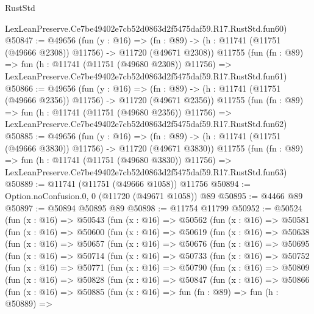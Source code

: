\begin{lexlean}{RustStd}
\begin{coremodule}
    LexLeanPreserve.Ce7be49402e7cb52d0863d2f5475daf59.R17.RustStd.fun60)
@50847 := @49656
    (fun (y : @16) =>
    (fn : @89) -> (h : @11741 (@11751 (@49666 @2308)) @11756) -> @11720 (@49671 @2308))
    @11755
    (fun (fn : @89) =>
    fun (h : @11741 (@11751 (@49680 @2308)) @11756) =>
    LexLeanPreserve.Ce7be49402e7cb52d0863d2f5475daf59.R17.RustStd.fun61)
@50866 := @49656
    (fun (y : @16) =>
    (fn : @89) -> (h : @11741 (@11751 (@49666 @2356)) @11756) -> @11720 (@49671 @2356))
    @11755
    (fun (fn : @89) =>
    fun (h : @11741 (@11751 (@49680 @2356)) @11756) =>
    LexLeanPreserve.Ce7be49402e7cb52d0863d2f5475daf59.R17.RustStd.fun62)
@50885 := @49656
    (fun (y : @16) =>
    (fn : @89) -> (h : @11741 (@11751 (@49666 @3830)) @11756) -> @11720 (@49671 @3830))
    @11755
    (fun (fn : @89) =>
    fun (h : @11741 (@11751 (@49680 @3830)) @11756) =>
    LexLeanPreserve.Ce7be49402e7cb52d0863d2f5475daf59.R17.RustStd.fun63)
@50889 := @11741 (@11751 (@49666 @1058)) @11756
@50894 := Option.noConfusion.{0, 0} (@11720 (@49671 @1058)) @89
@50895 := @4466 @89
@50897 := @50894 @50895 @89
@50898 := @11754 @11799
@50952 := @50524
    (fun (x : @16) =>
    @50543
      (fun (x : @16) =>
      @50562
        (fun (x : @16) =>
        @50581
          (fun (x : @16) =>
          @50600
            (fun (x : @16) =>
            @50619
              (fun (x : @16) =>
              @50638
                (fun (x : @16) =>
                @50657
                  (fun (x : @16) =>
                  @50676
                    (fun (x : @16) =>
                    @50695
                      (fun (x : @16) =>
                      @50714
                        (fun (x : @16) =>
                        @50733
                          (fun (x : @16) =>
                          @50752
                            (fun (x : @16) =>
                            @50771
                              (fun (x : @16) =>
                              @50790
                                (fun (x : @16) =>
                                @50809
                                  (fun (x : @16) =>
                                  @50828
                                    (fun (x : @16) =>
                                    @50847
                                      (fun (x : @16) =>
                                      @50866
                                        (fun (x : @16) =>
                                        @50885
                                          (fun (x : @16) =>
                                          fun (fn : @89) =>
                                          fun (h : @50889) =>

\end{coremodule}
\end{lexlean}
